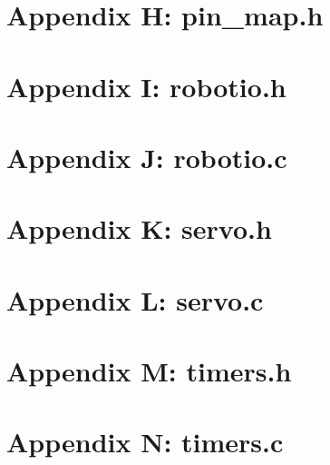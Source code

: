 \documentclass[letterpaper,11pt]{texMemo} %
\begin{document}
\section*{Appendix H: pin\_map.h}
\begin{tiny}

\end{tiny}
\newpage

\section*{Appendix I: robotio.h}
\begin{tiny}

\end{tiny}
\newpage

\section*{Appendix J: robotio.c}
\begin{tiny}

\end{tiny}
\newpage

\section*{Appendix K: servo.h}
\begin{tiny}

\end{tiny}
\newpage

\section*{Appendix L: servo.c}
\begin{tiny}

\end{tiny}
\newpage

\section*{Appendix M: timers.h}
\begin{tiny}

\end{tiny}
\newpage

\section*{Appendix N: timers.c}
\begin{tiny}

\end{tiny}
\newpage
\end{document}
